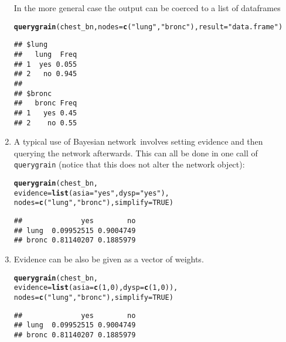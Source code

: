 \documentclass[10pt]{article}\usepackage[]{graphicx}\usepackage[]{xcolor}
\makeatletter
\newcommand{\hlnum}[1]{\textcolor[rgb]{0.686,0.059,0.569}{#1}}%
\newcommand{\hlstr}[1]{\textcolor[rgb]{0.192,0.494,0.8}{#1}}%
\newcommand{\hlstd}[1]{\textcolor[rgb]{0.345,0.345,0.345}{#1}}%
\newcommand{\hlkwc}[1]{\textcolor[rgb]{0.333,0.667,0.333}{#1}}%
\newcommand{\hlkwd}[1]{\textcolor[rgb]{0.737,0.353,0.396}{\textbf{#1}}}%
\newenvironment{kframe}{%
 \def\at@end@of@kframe{}%
 \ifinner\ifhmode%
  \def\at@end@of@kframe{\end{minipage}}%
  \begin{minipage}{\columnwidth}%
 \fi\fi%
 \def\FrameCommand##1{\hskip\@totalleftmargin \hskip-\fboxsep
 \colorbox{shadecolor}{##1}\hskip-\fboxsep
     \hskip-\linewidth \hskip-\@totalleftmargin \hskip\columnwidth}%
 \MakeFramed {\advance\hsize-\width
   \@totalleftmargin\z@ \linewidth\hsize
   \@setminipage}}%
 {\par\unskip\endMakeFramed%
 \at@end@of@kframe}
\newenvironment{knitrout}{}{} %
\def\code#1{{\texttt{#1}}}
\def\bn{Bayesian network}
\makeatother
\begin{document}
\begin{enumerate}
In the more general case the output can be coerced to a list of dataframes
\begin{knitrout}
\color{fgcolor}\begin{kframe}
\begin{alltt}
\hlkwd{querygrain}\hlstd{(chest_bn,} \hlkwc{nodes}\hlstd{=}\hlkwd{c}\hlstd{(}\hlstr{"lung"}\hlstd{,} \hlstr{"bronc"}\hlstd{),} \hlkwc{result}\hlstd{=}\hlstr{"data.frame"}\hlstd{)}
\end{alltt}
\begin{verbatim}
## $lung
##   lung  Freq
## 1  yes 0.055
## 2   no 0.945
## 
## $bronc
##   bronc Freq
## 1   yes 0.45
## 2    no 0.55
\end{verbatim}
\end{kframe}
\end{knitrout}

\item A typical use of \bn\ involves setting evidence and then
  querying the network afterwards. This can all be done in one call of
  \code{querygrain} (notice that this does not alter the network object):

\begin{knitrout}
\color{fgcolor}\begin{kframe}
\begin{alltt}
\hlkwd{querygrain}\hlstd{(chest_bn,}
           \hlkwc{evidence}\hlstd{=}\hlkwd{list}\hlstd{(}\hlkwc{asia}\hlstd{=}\hlstr{"yes"}\hlstd{,} \hlkwc{dysp}\hlstd{=}\hlstr{"yes"}\hlstd{),}
           \hlkwc{nodes}\hlstd{=}\hlkwd{c}\hlstd{(}\hlstr{"lung"}\hlstd{,} \hlstr{"bronc"}\hlstd{),} \hlkwc{simplify} \hlstd{=} \hlnum{TRUE}\hlstd{)}
\end{alltt}
\begin{verbatim}
##              yes        no
## lung  0.09952515 0.9004749
## bronc 0.81140207 0.1885979
\end{verbatim}
\end{kframe}
\end{knitrout}

\item Evidence can be also be given as a vector of weights. 

\begin{knitrout}
\color{fgcolor}\begin{kframe}
\begin{alltt}
\hlkwd{querygrain}\hlstd{(chest_bn,}
           \hlkwc{evidence}\hlstd{=}\hlkwd{list}\hlstd{(}\hlkwc{asia}\hlstd{=}\hlkwd{c}\hlstd{(}\hlnum{1}\hlstd{,}\hlnum{0}\hlstd{),} \hlkwc{dysp}\hlstd{=}\hlkwd{c}\hlstd{(}\hlnum{1}\hlstd{,}\hlnum{0}\hlstd{)),}
           \hlkwc{nodes}\hlstd{=}\hlkwd{c}\hlstd{(}\hlstr{"lung"}\hlstd{,} \hlstr{"bronc"}\hlstd{),} \hlkwc{simplify} \hlstd{=} \hlnum{TRUE}\hlstd{)}
\end{alltt}
\begin{verbatim}
##              yes        no
## lung  0.09952515 0.9004749
## bronc 0.81140207 0.1885979
\end{verbatim}
\end{kframe}
\end{knitrout}


\end{enumerate}
\end{document}
